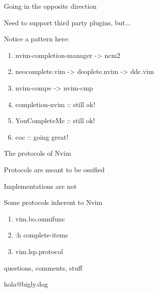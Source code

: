 \documentclass{beamer}
\begin{document}
\begin{frame}{Going in the opposite direction}

	Need to support third party plugins, but...

	Notice a pattern here:

	\begin{enumerate}

		\item nvim-completion-manager -> ncm2

		\item neocomplete.vim -> deoplete.nvim -> ddc.vim

		\item nvim-compe -> nvim-cmp

		\item completion-nvim :: still ok!

		\item YouCompleteMe :: still ok!

		\item coc :: going great!

	\end{enumerate}


\end{frame}


\begin{frame}{The protocols of Nvim}

	Protocols are meant to be ossified

	Implementations are not

	Some protocols inherent to Nvim

	\begin{enumerate}

		\item vim.bo.omnifunc

		\item :h complete-items

		\item vim.lsp.protocol

	\end{enumerate}

\end{frame}


\begin{frame}[standout]

	questions, comments, stuff

	hola@bigly.dog

\end{frame}
\end{document}
